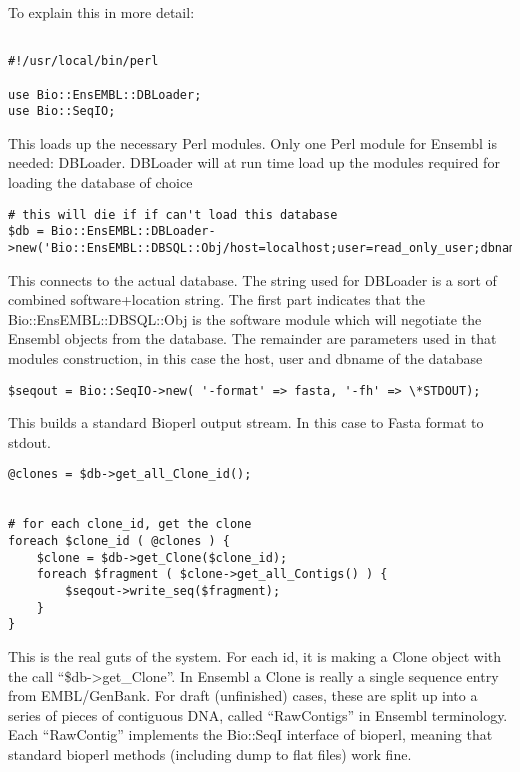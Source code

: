 \documentclass[11pt,a4paper]{article}
\begin{document}
To explain this in more detail:

\begin{verbatim}

#!/usr/local/bin/perl

use Bio::EnsEMBL::DBLoader;
use Bio::SeqIO;

\end{verbatim}

This loads up the necessary Perl modules. Only one Perl module for Ensembl is needed: DBLoader.
DBLoader will at run time load up the modules required for loading the database of choice

\begin{verbatim}
# this will die if if can't load this database
$db = Bio::EnsEMBL::DBLoader->new('Bio::EnsEMBL::DBSQL::Obj/host=localhost;user=read_only_user;dbname=test_ensembl');
\end{verbatim}

This connects to the actual database. The string used for DBLoader is
a sort of combined software+location string. The first part indicates
that the Bio::EnsEMBL::DBSQL::Obj is the software module which will
negotiate the Ensembl objects from the database. The remainder are
parameters used in that modules construction, in this case the host,
user and dbname of the database

\begin{verbatim}
$seqout = Bio::SeqIO->new( '-format' => fasta, '-fh' => \*STDOUT);
\end{verbatim}

This builds a standard Bioperl output stream. In this case to Fasta format to stdout.

\begin{verbatim}
@clones = $db->get_all_Clone_id();


# for each clone_id, get the clone
foreach $clone_id ( @clones ) {
	$clone = $db->get_Clone($clone_id);
	foreach $fragment ( $clone->get_all_Contigs() ) {
		$seqout->write_seq($fragment);
   	}
}
\end{verbatim}

This is the real guts of the system. For each id, it is making a Clone
object with the call ``\$db->get\_Clone''. In Ensembl a Clone is
really a single sequence entry from EMBL/GenBank. For draft
(unfinished) cases, these are split up into a series of pieces of
contiguous DNA, called ``RawContigs'' in Ensembl terminology. Each
``RawContig'' implements the Bio::SeqI interface of bioperl, meaning
that standard bioperl methods (including dump to flat files) work
fine.
\end{document}
